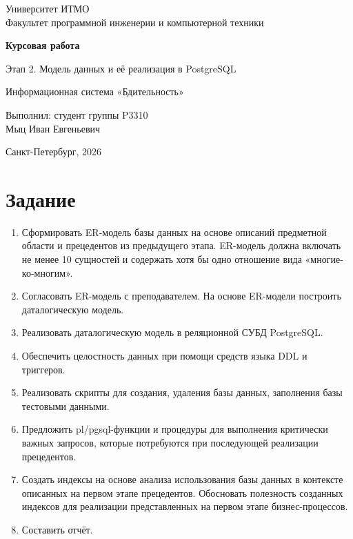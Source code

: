 \documentclass[12pt,a4paper]{article}
\begin{document}
\begin{titlepage}
\centering
Университет ИТМО\\
Факультет программной инженерии и компьютерной техники

\vspace{60mm}
{\Large\bfseries Курсовая работа\par}
\vspace{4mm}
{\large Этап 2. Модель данных и её реализация в PostgreSQL\par}
\vspace{8mm}
{\large Информационная система «Бдительность»\par}

\vfill
\begin{flushright}
Выполнил: студент группы P3310\\
Мыц Иван Евгеньевич
\end{flushright}
\vspace{20mm}
Санкт-Петербург, 2026
\end{titlepage}

\tableofcontents
\newpage

\section{Задание}
\begin{enumerate}
  \item Сформировать ER-модель базы данных на основе описаний предметной области и
        прецедентов из предыдущего этапа. ER-модель должна включать не менее 10 сущностей
        и содержать хотя бы одно отношение вида «многие-ко-многим».
  \item Согласовать ER-модель с преподавателем. На основе ER-модели построить даталогическую модель.
  \item Реализовать даталогическую модель в реляционной СУБД PostgreSQL.
  \item Обеспечить целостность данных при помощи средств языка DDL и триггеров.
  \item Реализовать скрипты для создания, удаления базы данных, заполнения базы тестовыми данными.
  \item Предложить pl/pgsql-функции и процедуры для выполнения критически важных запросов,
        которые потребуются при последующей реализации прецедентов.
  \item Создать индексы на основе анализа использования базы данных в контексте описанных на
        первом этапе прецедентов. Обосновать полезность созданных индексов для реализации
        представленных на первом этапе бизнес-процессов.
  \item Составить отчёт.
\end{enumerate}
\end{document}
